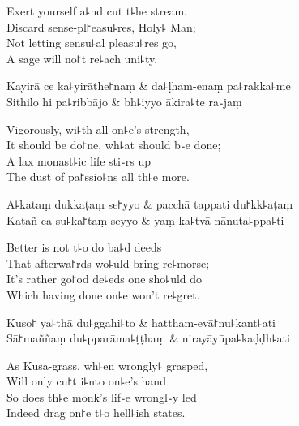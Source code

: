 \begin{english}
  Exert yourself a꜕nd cut t꜕he stream.\\
  Discard sense-pl꜓easu꜕res, Holy꜕ Man;\\
  Not letting sensu꜕al pleasu꜕res go,\\
  A sage will no꜓t re꜕ach uni꜕ty.
\end{english}

\begin{twochants}
  Kayirā ce ka꜕yirāthe꜓naṃ & da꜕ḷham-enaṃ pa꜕rakka꜕me \\
  Sithilo hi pa꜕ribbājo & bh꜕iyyo ākira꜕te ra꜕jaṃ \\
\end{twochants}

\begin{english}
  Vigorously, wi꜕th all on꜕e's strength,\\
  It should be do꜓ne, wh꜕at should b꜕e done;\\
  A lax monast꜕ic life sti꜕rs up\\
  The dust of pa꜓ssio꜕ns all th꜕e more.
\end{english}

\begin{twochants}
  A꜕kataṃ dukkaṭaṃ se꜓yyo & pacchā tappati du꜓kk꜕aṭaṃ \\
  Katañ-ca su꜕ka꜓taṃ seyyo & yaṃ ka꜕tvā nānuta꜕ppa꜕ti \\
\end{twochants}

\begin{english}
  Better is not t꜕o do ba꜕d deeds\\
  That afterwa꜓rds wo꜕uld bring re꜕morse;\\
  It's rather go꜓od de꜕eds one sho꜕uld do\\
  Which having done on꜕e won't re꜕gret.
\end{english}

\begin{twochants}
  Kuso꜓ ya꜕thā du꜕ggahi꜕to & hattham-evā꜓nu꜕kant꜕ati \\
  Sā꜓maññaṃ du꜕pparāma꜕ṭṭhaṃ & nirayāyūpa꜕kaḍḍh꜕ati \\
\end{twochants}

\begin{english}
  As Kusa-grass, wh꜕en wrongly꜕ grasped,\\
  Will only cu꜓t i꜕nto on꜕e's hand\\
  So does th꜕e monk's lif꜕e wrongl꜕y led\\
  Indeed drag on꜓e t꜕o hell꜕ish states.
\end{english}

